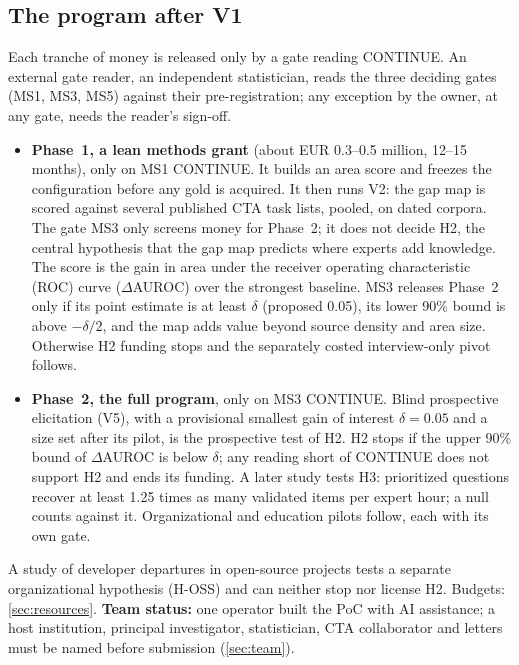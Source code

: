\subsection*{The program after V1}

\evfut{} Each tranche of money is released only by a gate reading CONTINUE. An external gate reader,
an independent statistician, reads the three deciding gates (MS1, MS3, MS5) against their
pre-registration; any exception by the owner, at any gate, needs the reader's sign-off.
\begin{itemize}[nosep]
  \item \textbf{Phase~1, a lean methods grant} (about EUR 0.3--0.5 million, 12--15 months), only on
    MS1 CONTINUE. It builds an area score and freezes the configuration before any gold is acquired.
    It then runs V2: the gap map is scored against several published CTA task lists, pooled, on
    dated corpora. The gate MS3 only screens money for Phase~2; it does not decide H2, the central
    hypothesis that the gap map predicts where experts add knowledge. The score is the gain in
    area under the receiver operating characteristic (ROC) curve ($\Delta$AUROC) over the strongest baseline. MS3 releases Phase~2 only
    if its point estimate is at least $\delta$ (proposed 0.05), its lower 90\% bound is above
    $-\delta/2$, and the map adds value beyond source density and area size. Otherwise H2 funding stops and the
    separately costed interview-only pivot follows.
  \item \textbf{Phase~2, the full program}, only on MS3 CONTINUE. Blind prospective elicitation
    (V5), with a provisional smallest gain of interest $\delta = 0.05$ and a size set after its
    pilot, is the prospective test of H2. H2 stops if the upper 90\% bound of $\Delta$AUROC is below $\delta$; any reading
    short of CONTINUE does not support H2 and ends its funding. A later study tests H3: prioritized
    questions recover at least 1.25 times as many validated items per expert hour; a null counts
    against it. Organizational and education pilots follow, each with its own gate.
\end{itemize}
A study of developer departures in open-source projects tests a separate organizational hypothesis
(H-OSS) and can neither stop nor license H2. Budgets: \cref{sec:resources}. \textbf{Team status:} one operator
built the PoC with AI assistance; a host institution, principal investigator, statistician, CTA
collaborator and letters must be named before submission (\cref{sec:team}).
